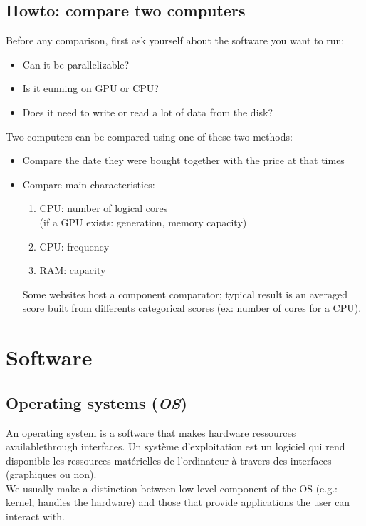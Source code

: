 \documentclass[11pt]{article}
\begin{document}
		\subsection{Howto: compare two computers}
			Before any comparison, first ask yourself about the software you want to run:
			\begin{itemize}
				\item Can it be parallelizable?
				\item Is it eunning on GPU or CPU?
				\item Does it need to write or read a lot of data from the disk?
			\end{itemize}
			Two computers can be compared using one of these two methods:
			\begin{itemize}
				\item Compare the date they were bought together with the price at that times
				\item Compare main characteristics:
				\begin{enumerate}
					\item CPU: number of logical cores \\
					(if a GPU exists: generation, memory capacity)
					\item CPU: frequency
					\item RAM: capacity
				\end{enumerate}
				Some websites host a component comparator; typical result is an averaged score built from differents categorical scores (ex: number of cores for a CPU).
			\end{itemize}


	\section{Software}

		\subsection{Operating systems (\textit{OS})}
			An operating system is a software that makes hardware ressources availablethrough interfaces.
			Un système d'exploitation est un logiciel qui rend disponible les ressources matérielles de l'ordinateur à travers
			des interfaces (graphiques ou non). \\
			We usually make a distinction between low-level component of the OS (e.g.: kernel, handles the hardware) and those that provide
			applications the user can interact with. 
\end{document}

